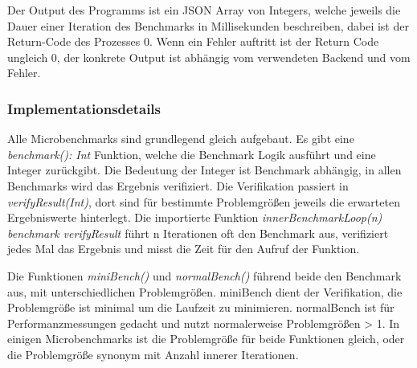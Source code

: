Der Output des Programms ist ein JSON Array von Integers, welche jeweils die Dauer einer Iteration des Benchmarks in Millisekunden beschreiben, dabei ist der Return-Code des Prozesses 0.
Wenn ein Fehler auftritt ist der Return Code ungleich 0, der konkrete Output ist abhängig vom verwendeten Backend und vom Fehler. 

\subsubsection{Implementationsdetails}
Alle Microbenchmarks sind grundlegend gleich aufgebaut.
Es gibt eine \textit{benchmark(): Int} Funktion, welche die Benchmark Logik ausführt und eine Integer zurückgibt. Die Bedeutung der Integer ist Benchmark abhängig, in allen Benchmarks wird das Ergebnis verifiziert. Die Verifikation passiert in \textit{verifyResult(Int)}, dort sind für bestimmte Problemgrößen jeweils die erwarteten Ergebniswerte hinterlegt.
Die importierte Funktion \textit{innerBenchmarkLoop(n){ benchmark }{ verifyResult }} führt n Iterationen oft den Benchmark aus, verifiziert jedes Mal das Ergebnis und misst die Zeit für den Aufruf der Funktion.

Die Funktionen \textit{miniBench()} und \textit{normalBench()} führend beide den Benchmark aus, mit unterschiedlichen Problemgrößen. miniBench dient der Verifikation, die Problemgröße ist minimal um die Laufzeit zu minimieren.
normalBench ist für Performanzmessungen gedacht und nutzt normalerweise Problemgrößen > 1. In einigen Microbenchmarks ist die Problemgröße für beide Funktionen gleich, oder die Problemgröße synonym mit Anzahl innerer Iterationen.

